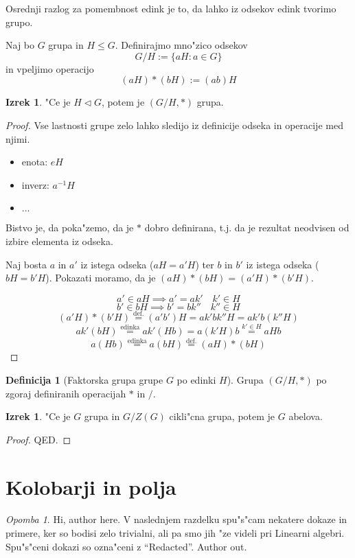 \documentclass[11pt, a4paper]{article}
\theoremstyle{definition}
\newtheorem{defn}[counter]{Definicija}
\newtheorem{theorem}[counter]{Izrek}
\theoremstyle{remark}
\newtheorem*{rem}{Opomba}
\begin{document}
	Osrednji razlog za pomembnost edink je to, da lahko iz odsekov edink tvorimo grupo.
	
	Naj bo $G$ grupa in $H \leq G$. Definirajmo mno"zico odsekov
	\[ G / H := \lbrace aH: a \in G \rbrace \]
	in vpeljimo operacijo
	\[ (aH)*(bH) := (ab)H \]
	\begin{theorem}
		"Ce je $H \triangleleft G$, potem je $(G / H, *)$ grupa.
	\end{theorem}
	\begin{proof}
		Vse lastnosti grupe zelo lahko sledijo iz definicije odseka in operacije med njimi.
		\begin{itemize}
			\item enota: $eH$
			\item inverz: $a^{-1}H$
			\item $\ldots$
		\end{itemize}
		Bistvo je, da poka"zemo, da je $*$ dobro definirana, t.j. da je rezultat neodvisen od izbire elementa iz odseka.
		
		Naj bosta $a$ in $a'$ iz istega odseka ($aH = a'H$) ter $b$ in $b'$ iz istega odseka ($bH = b'H$). Pokazati moramo, da je $(aH)*(bH)  = (a'H)*(b'H)$.
		
		\[ a' \in aH \implies a' = ak' \quad k' \in H \]
		\[ b' \in bH \implies b' = bk'' \quad k'' \in H \]
		\[ (a'H)*(b'H) \overset{\text{def.}}{=} (a'b')H = ak'bk''H = ak'b(k''H) \]
		\[ ak'(bH) \overset{\text{edinka}}{=} ak'(Hb) = a(k'H)b \overset{k' \in H}{=} aHb \]
		\[ a(Hb) \overset{\text{edinka}}{=} a(bH) \overset{\text{def.}}{=} (aH)*(bH) \]
	\end{proof}

	\begin{defn}[Faktorska grupa grupe $G$ po edinki $H$]
		Grupa $(G / H, *)$ po zgoraj definiranih operacijah $*$ in $/$.
	\end{defn}

	\begin{theorem}
		"Ce je $G$ grupa in $G/Z(G)$ cikli"cna grupa, potem je $G$ abelova.
	\end{theorem}
	\begin{proof}
		QED.
	\end{proof}

	\section{Kolobarji in polja}
	\begin{rem}
		Hi, author here. V naslednjem razdelku spu"s"cam nekatere dokaze in primere, ker so bodisi zelo trivialni, ali pa smo jih "ze videli pri Linearni algebri. Spu"s"ceni dokazi so ozna"ceni z ``Redacted''.
		Author out.
	\end{rem}
\end{document}
